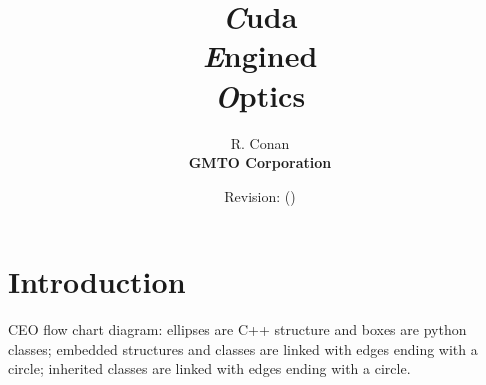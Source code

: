 \documentclass[oldfontcommands]{memoir}
\begin{document}
\title{
    \textbf{\Huge{\HUGE\textsl{C}}uda\\{\HUGE\textsl{E}}ngined\\{\HUGE\textsl{O}}ptics}
}
\author{R. Conan\\\bf GMTO Corporation}
\date{Revision\gitVtags\gitReferences: \gitAbbrevHash{} (\gitAuthorDate)}

\maketitle
\newpage
\tableofcontents

% 


\chapter{Introduction}

CEO flow chart diagram: ellipses are C++ structure and boxes are python classes; embedded structures and classes are linked with edges ending with a circle; inherited classes are linked with edges ending with a circle.





%


\printindex
\end{document}
